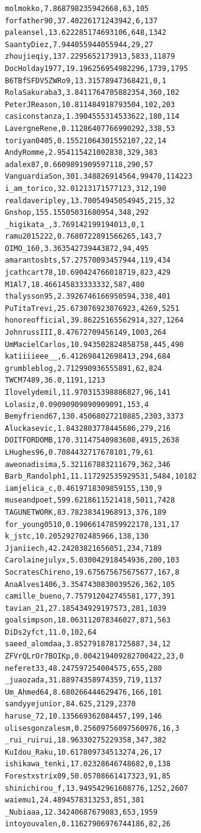 \begin{verbatim}
molmokko,7.868798235942668,63,105
forfather90,37.40226171243942,6,137
paleansel,13.622285174693106,648,1342
SaantyDiez,7.944055944055944,29,27
zhoujieqiy,137.2295652173913,5833,11879
DocHolday1977,19.196256954982296,1739,1795
B6TBfSFDV5ZWRo9,13.31578947368421,0,1
RolaSakuraba3,3.8411764705882354,360,102
PeterJReason,10.811484918793504,102,203
casiconstanza,1.3904555314533622,180,114
LavergneRene,0.11286407766990292,338,53
toriyan0405,0.15521064301552107,22,14
AndyRomme,2.954115421002838,329,383
adalex87,0.6609891909597118,290,57
VanguardiaSon,301.348826914564,99470,114223
i_am_torico,32.01213171577123,312,190
realdaveripley,13.70054945054945,215,32
Gnshop,155.15505031680954,348,292
_higikata_,3.769142199194013,0,1
ramu2015222,0.7680722891566265,143,7
OIMO_160,3.363542739443872,94,495
amarantosbts,57.27570093457944,119,434
jcathcart78,10.690424766018719,823,429
M1Al7,18.466145833333332,587,480
thalysson95,2.3926746166950594,338,401
PuTitaTrevi,25.673076923076923,4269,5251
honoreofficial,39.86225165562914,327,1264
JohnrussIII,8.47672709456149,1003,264
UmMacielCarlos,10.943502824858758,445,490
katiiiieee__,6.412698412698413,294,684
grumbleblog,2.712990936555891,62,824
TWCM7489,36.0,1191,1213
Ilovelydemil,11.970315398886827,96,141
Lolasiz,0.09090909090909091,153,4
Bemyfriend67,130.45068027210885,2303,3373
Aluckasevic,1.8432803778445686,279,216
DOITFORDOMB,170.31147540983608,4915,2638
LHughes96,0.7084432717678101,79,61
aweonadisima,5.321167883211679,362,346
Barb_Randolph1,11.117292535929531,5484,10182
iamjelica_c,0.4619718309859155,130,9
museandpoet,599.6218611521418,5011,7428
TAGUNETWORK,83.78238341968913,376,189
for_young0510,0.19066147859922178,131,17
k_jstc,10.205292702485966,138,130
Jjaniiech,42.24203821656051,234,7189
Carolainejulyx,5.030042918454936,200,103
SocratesChireno,19.675675675675677,167,8
AnaAlves1406,3.3547430830039526,362,105
camille_bueno,7.757912042745581,177,391
tavian_21,27.185434929197573,281,1039
goalsimpson,18.063112078346027,871,563
DiDs2yfct,11.0,102,64
saeed_alomdaa,3.8527918781725887,34,12
ZFVrQLrOr7BOIKp,0.004219409282700422,23,0
neferet33,48.247597254004575,655,280
_juaozada,31.88974358974359,719,1137
Um_Ahmed64,8.680266444629476,166,101
sandyyejunior,84.625,2129,2370
haruse_72,10.135669362084457,199,146
ulisesgonzalesm,0.25609756097560976,16,3
_rui_ruirui,18.96330275229358,347,382
KuIdou_Raku,10.617809734513274,26,17
ishikawa_tenki,17.02328646748682,0,138
Forestxstrix09,50.05708661417323,91,85
shinichirou_f,13.949542961608776,1252,2607
waiemu1,24.4894578313253,851,381
_Nubiaaa,12.34240687679083,653,1959
intoyouvalen,0.11627906976744186,82,26

\end{verbatim}
